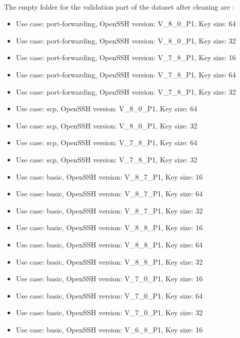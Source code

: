         \paragraph{}The empty folder for the validation part of the dataset after cleaning are : 
        \begin{itemize}
            \item Use case: port-forwarding, OpenSSH version: V\_8\_0\_P1, Key size: 64
            \item Use case: port-forwarding, OpenSSH version: V\_8\_0\_P1, Key size: 32
            \item Use case: port-forwarding, OpenSSH version: V\_7\_8\_P1, Key size: 16
            \item Use case: port-forwarding, OpenSSH version: V\_7\_8\_P1, Key size: 64
            \item Use case: port-forwarding, OpenSSH version: V\_7\_8\_P1, Key size: 32
            \item Use case: scp, OpenSSH version: V\_8\_0\_P1, Key size: 64
            \item Use case: scp, OpenSSH version: V\_8\_0\_P1, Key size: 32
            \item Use case: scp, OpenSSH version: V\_7\_8\_P1, Key size: 64
            \item Use case: scp, OpenSSH version: V\_7\_8\_P1, Key size: 32
            \item Use case: basic, OpenSSH version: V\_8\_7\_P1, Key size: 16
            \item Use case: basic, OpenSSH version: V\_8\_7\_P1, Key size: 64
            \item Use case: basic, OpenSSH version: V\_8\_7\_P1, Key size: 32
            \item Use case: basic, OpenSSH version: V\_8\_8\_P1, Key size: 16
            \item Use case: basic, OpenSSH version: V\_8\_8\_P1, Key size: 64
            \item Use case: basic, OpenSSH version: V\_8\_8\_P1, Key size: 32
            \item Use case: basic, OpenSSH version: V\_7\_0\_P1, Key size: 16
            \item Use case: basic, OpenSSH version: V\_7\_0\_P1, Key size: 64
            \item Use case: basic, OpenSSH version: V\_7\_0\_P1, Key size: 32
            \item Use case: basic, OpenSSH version: V\_6\_8\_P1, Key size: 16

\end{itemize}
